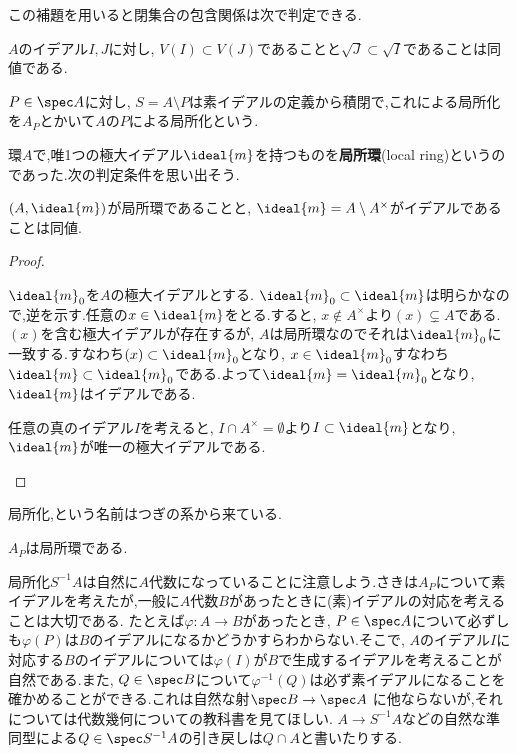 この補題を用いると閉集合の包含関係は次で判定できる.
\begin{prop}
	$A$のイデアル$I,J$に対し, $V(I)\subset V(J)$であることと$\sqrt{J}\subset\sqrt{I}$であることは同値である.
\end{prop}

\begin{defi}
	$ P\in\spec A$に対し, $S=A\setminus P$は素イデアルの定義から積閉で,これによる局所化を$A_P$とかいて$A$の$P$による局所化という.
\end{defi}

環$A$で,唯1つの極大イデアル$\ideal{m}$を持つものを\textbf{局所環}(local ring)というのであった.次の判定条件を思い出そう.

\begin{prop}\label{prop:local ring equiv}
	$(A,\ideal{m})$が局所環であることと, $\ideal{m}=A\setminus A^\times$がイデアルであることは同値.
\end{prop}

\begin{proof}
	\begin{eqv}
		\item $\ideal{m}_0$を$A$の極大イデアルとする. $\ideal{m}_0\subset\ideal{m}$は明らかなので,逆を示す.任意の$x\in\ideal{m}$をとる.すると, $x\not\in A^\times$より$(x)\subsetneq A$である. $(x)$を含む極大イデアルが存在するが, $A$は局所環なのでそれは$\ideal{m}_0$に一致する.すなわち$(x)\subset\ideal{m}_0$となり, $x\in\ideal{m}_0$すなわち$\ideal{m}\subset\ideal{m}_0$である.よって$\ideal{m}=\ideal{m}_0$となり, $\ideal{m}$はイデアルである.
		\item 任意の真のイデアル$I$を考えると, $I\cap A^\times=\emptyset$より$I\subset\ideal{m}$となり, $\ideal{m}$が唯一の極大イデアルである. 
	\end{eqv}
\end{proof}

局所化,という名前はつぎの系から来ている.
\begin{cor}
	$A_P$は局所環である.
\end{cor}

局所化$S^{-1}A$は自然に$A$代数になっていることに注意しよう.さきは$A_P$について素イデアルを考えたが,一般に$A$代数$B$があったときに(素)イデアルの対応を考えることは大切である. たとえば$\varphi:A\to B$があったとき, $P\in\spec A$について必ずしも$\varphi(P)$は$B$のイデアルになるかどうかすらわからない.そこで, $A$のイデアル$I$に対応する$B$のイデアルについては$\varphi(I)$が$B$で生成するイデアルを考えることが自然である.また, $Q\in\spec B$について$\varphi^{-1}(Q)$は必ず素イデアルになることを確かめることができる.これは自然な射$\spec B\to\spec A$
に他ならないが,それについては代数幾何についての教科書を見てほしい. $A\to S^{-1}A$などの自然な準同型による$Q\in\spec S^{-1}A$の引き戻しは$Q\cap A$と書いたりする.

